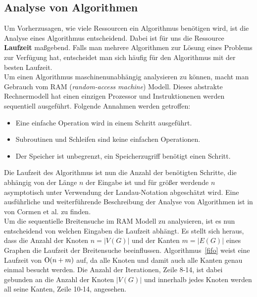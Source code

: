 \documentclass[11pt,a4paper]{article}
\begin{document}
\subsection{Analyse von Algorithmen}
Um Vorherzusagen, wie viele Ressourcen ein Algorithmus benötigen wird, ist die Analyse eines Algorithmus entscheidend. Dabei ist für uns die Ressource \textbf{Laufzeit} maßgebend. Falls man mehrere Algorithmen zur Lösung eines Problems zur Verfügung hat, entscheidet man sich häufig für den Algorithmus mit der besten Laufzeit.\\
Um einen Algorithmus maschinenunabhängig analysieren zu können, macht man Gebrauch vom RAM (\textit{random-access machine}) Modell. Dieses abstrakte Rechnermodell hat einen einzigen Prozessor und Instruktionenen werden sequentiell ausgeführt. Folgende Annahmen werden getroffen:
\begin{itemize}
	\item{Eine einfache Operation wird in einem Schritt ausgeführt.}
	\item{Subroutinen und Schleifen sind keine einfachen Operationen.}
	\item{Der Speicher ist unbegrenzt, ein Speicherzugriff benötigt einen Schritt.}
\end{itemize}
Die Laufzeit des Algorithmus ist nun die Anzahl der benötigten Schritte, die abhängig von der Länge \(n\) der Eingabe ist und für größer werdende \(n\) asymptotisch unter Verwendung der Landau-Notation abgeschätzt wird. Eine ausführliche und weiterführende Beschreibung der Analyse von Algorithmen ist in \cite{cormen_introduction_2009} von Cormen et al. zu finden.\\
Um die sequentielle Breitensuche im RAM Modell zu analysieren, ist es nun entscheidend von welchen Eingaben die Laufzeit abhängt. Es stellt sich heraus, dass die Anzahl der Knoten \(n = |V(G)|\) und der Kanten \(m = |E(G)|\) eines Graphen die Laufzeit der Breitensuche beeinflussen. Algorithmus~\ref{fifo} weist eine Laufzeit von \($O$(n + m)\) auf, da alle Knoten und damit auch alle Kanten genau einmal besucht werden. Die Anzahl der Iterationen, Zeile 8-14, ist dabei gebunden an die Anzahl der Knoten \(|V(G)|\) und innerhalb jedes Knoten werden all seine Kanten, Zeile 10-14, angesehen. 
\end{document}
